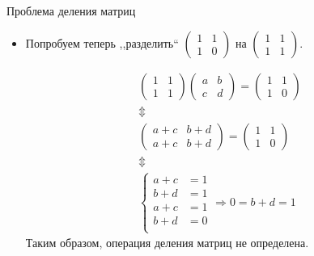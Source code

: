 \documentclass[unicode,11pt,notheorems]{beamer}
\begin{document}
\begin{frame}[allowframebreaks]{Проблема деления матриц}
\begin{itemize}
\item 
	Попробуем теперь ,,разделить`` $\begin{pmatrix} 1 & 1 \\ 1 & 0 \end{pmatrix}$ на $\begin{pmatrix} 1 & 1 \\ 1 & 1 \end{pmatrix}$.

$$
\begin{gathered}
	\begin{pmatrix} 
		1 & 1 \\ 
		1 & 1 
	\end{pmatrix}
	\begin{pmatrix} 
		a & b \\ 
		c & d 
	\end{pmatrix} 
	= 
	\begin{pmatrix} 
		1 & 1 \\ 
		1 & 0
	\end{pmatrix}
	\\\Updownarrow
	\\
	\begin{pmatrix} 
		a+c & b+d \\ 
		a+c & b+d 
	\end{pmatrix} 
	= 
	\begin{pmatrix} 
		1 & 1 \\ 
		1 & 0 
	\end{pmatrix}
	\\\Updownarrow
	\\
\left\lbrace\begin{aligned}
	a+c &= 1\\
	b+d &=1\\
	a+c &=1\\
	b+d &=0\\
\end{aligned}
\right. \Longrightarrow 0=b+d=1
\end{gathered}
$$
\alert{Таким образом, операция деления матриц не определена.}
\end{itemize}

\end{frame}
\end{document}
